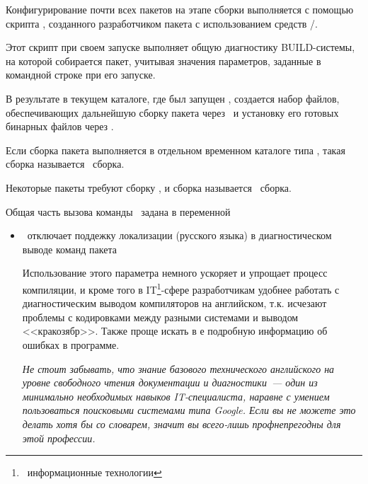 
Конфигурирование почти всех пакетов на этапе сборки выполняется с помощью
скрипта , созданного разработчиком пакета с
использованием средств /.

Этот скрипт при своем запуске выполняет общую диагностику BUILD-системы, на
которой собирается пакет, учитывая значения параметров, заданные в командной
строке при его запуске.

В результате в текущем каталоге, где был запущен , создается
набор файлов, обеспечивающих дальнейшую сборку пакета через \ и
установку его готовых бинарных файлов через .

Если сборка пакета выполняется в отдельном временном каталоге типа
, такая сборка называется \ сборка.

Некоторые пакеты требуют сборку 
, и сборка называется \ сборка.

Общая часть вызова команды \ задана в переменной 



\begin{itemize}
  \item {}\ отключает поддежку локализации (русского языка) в
  диагностическом выводе команд пакета
  
  Использование этого параметра немного ускоряет и упрощает процесс компиляции,
  и кроме того в IT\footnote{\ информационные технологии}-сфере разработчикам
  удобнее работать с диагностическим выводом компиляторов на английском, т.к.
  исчезают проблемы с кодировками между разными системами и выводом
  <<кракозябр>>. Также проще искать в \internet е подробную информацию об
  ошибках в программе.
  
  \emph{Не стоит забывать, что знание базового технического английского на
  уровне свободного чтения документации и диагностики\ --- один из минимально
  необходимых навыков IT-специалиста, наравне с умением пользоваться поисковыми
  системами типа Google. Если вы не можете это делать хотя бы со словарем,
  значит вы всего-лишь профнепрегодны для этой профессии.}
\end{itemize}

\secup
{}
\secdown

